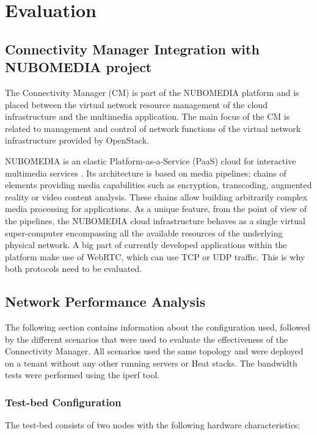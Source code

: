 \chapter{Evaluation}


\section{Connectivity Manager Integration with NUBOMEDIA project}


The Connectivity Manager (CM) is part of the NUBOMEDIA platform and is placed between the virtual network resource management of the cloud infrastructure and the
multimedia application. The main focus of the CM is related to management and control of network functions of the virtual network infrastructure provided by OpenStack.

NUBOMEDIA is an elastic Platform-as-a-Service (PaaS) cloud for interactive multimedia services \cite{nubomedia}. Its architecture is based on media pipelines: chains of elements providing media capabilities such as encryption, transcoding, augmented reality or video content analysis. These chains allow building arbitrarily complex media processing for applications. As a unique feature, from the point of view of the pipelines, the NUBOMEDIA cloud infrastructure behaves as a single virtual super-computer encompassing all the available resources of the underlying physical network. A big part of currently developed applications within the platform make use of WebRTC, which can use TCP or UDP traffic. This is why both protocols need to be evaluated.

\section{Network Performance Analysis}

The following section contains information about the configuration used, followed by the different scenarios that were used to evaluate the effectiveness of the Connectivity Manager. All scenarios used the same topology and were deployed on a tenant without any other running servers or Heat stacks. The bandwidth tests were performed using the iperf tool.

\newpage
\subsection{Test-bed Configuration}

The test-bed consists of two nodes with the following hardware characteristics:

